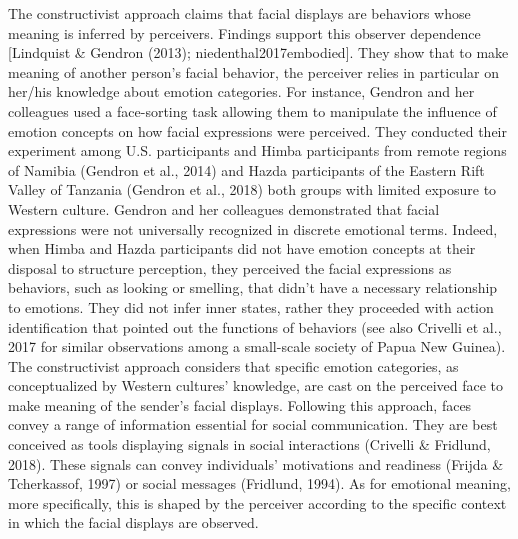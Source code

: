 \documentclass[
  english,
  doc]{apa7}
\begin{document}
The constructivist approach claims that facial displays are behaviors whose meaning is inferred by perceivers. Findings support this observer dependence {[}Lindquist \& Gendron (2013); niedenthal2017embodied{]}. They show that to make meaning of another person's facial behavior, the perceiver relies in particular on her/his knowledge about emotion categories. For instance, Gendron and her colleagues used a face-sorting task allowing them to manipulate the influence of emotion concepts on how facial expressions were perceived. They conducted their experiment among U.S. participants and Himba participants from remote regions of Namibia (Gendron et al., 2014) and Hazda participants of the Eastern Rift Valley of Tanzania (Gendron et al., 2018) both groups with limited exposure to Western culture. Gendron and her colleagues demonstrated that facial expressions were not universally recognized in discrete emotional terms. Indeed, when Himba and Hazda participants did not have emotion concepts at their disposal to structure perception, they perceived the facial expressions as behaviors, such as looking or smelling, that didn't have a necessary relationship to emotions. They did not infer inner states, rather they proceeded with action identification that pointed out the functions of behaviors (see also Crivelli et al., 2017 for similar observations among a small-scale society of Papua New Guinea). The constructivist approach considers that specific emotion categories, as conceptualized by Western cultures' knowledge, are cast on the perceived face to make meaning of the sender's facial displays. Following this approach, faces convey a range of information essential for social communication. They are best conceived as tools displaying signals in social interactions (Crivelli \& Fridlund, 2018). These signals can convey individuals' motivations and readiness (Frijda \& Tcherkassof, 1997) or social messages (Fridlund, 1994). As for emotional meaning, more specifically, this is shaped by the perceiver according to the specific context in which the facial displays are observed.
\end{document}
